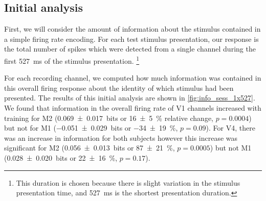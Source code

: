\subsection{Initial analysis}
\label{sec:pl_initial}

First, we will consider the amount of information about the stimulus contained in a simple firing rate encoding.
For each test stimulus presentation, our response is the total number of spikes which were detected from a single channel during the first \SI{527}{\milli\second} of the stimulus presentation.%
\footnote{This duration is chosen because there is slight variation in the stimulus presentation time, and \SI{527}{\milli\second} is the shortest presentation duration.}

For each recording channel, we computed how much information was contained in this overall firing response about the identity of which stimulus had been presented.
The results of this initial analysis are shown in \autoref{fig:info_sess_1x527}.
We found that information in the overall firing rate of \ac{V1} channels increased with training for \ac{M2} (\SI{+0.069\pm0.017}{bits} or \SI{+16\pm5}{\percent} relative change, $p=0.0004$) but not for \ac{M1} (\SI{-0.051\pm0.029}{bits} or \SI{-34\pm19}{\percent}, $p=0.09$).
For \ac{V4}, there was an increase in information for both subjects however this increase was significant for \ac{M2} (\SI{+0.056\pm0.013}{bits} or \SI{+87\pm21}{\percent}, $p=0.0005$) but not \ac{M1} (\SI{+0.028\pm0.020}{bits} or \SI{+22\pm16}{\percent}, $p=0.17$).



